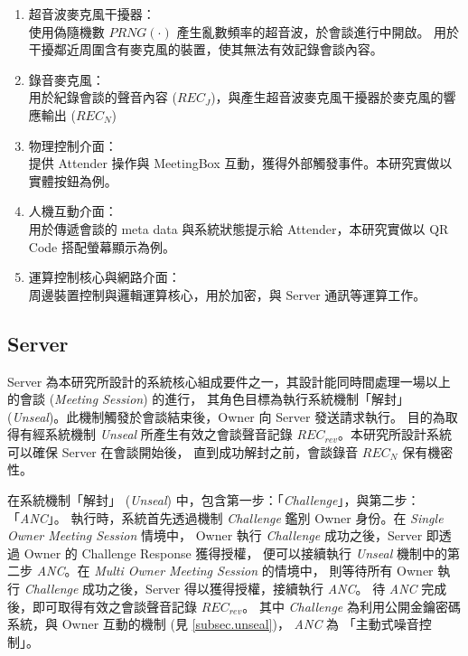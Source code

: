     \begin{enumerate}
        \item 超音波麥克風干擾器：\\
            使用偽隨機數 $PRNG(·)$ 產生亂數頻率的超音波，於會談進行中開啟。
            用於干擾鄰近周圍含有麥克風的裝置，使其無法有效記錄會談內容。

        \item 錄音麥克風：\\
            用於紀錄會談的聲音內容 ($REC_{J}$)，與產生超音波麥克風干擾器於麥克風的響應輸出 ($REC_{N}$)

        \item 物理控制介面：\\
            提供 Attender 操作與 MeetingBox 互動，獲得外部觸發事件。本研究實做以實體按鈕為例。

        \item 人機互動介面：\\
            用於傳遞會談的 meta data 與系統狀態提示給 Attender，本研究實做以 QR Code 搭配螢幕顯示為例。

        \item 運算控制核心與網路介面：\\
            周邊裝置控制與邏輯運算核心，用於加密，與 Server 通訊等運算工作。
    \end{enumerate}


\subsection{Server}

    Server 為本研究所設計的系統核心組成要件之一，其設計能同時間處理一場以上的會談 ({\it Meeting Session}) 的進行，
其角色目標為執行系統機制「解封」 ({\it Unseal})。此機制觸發於會談結束後，Owner 向 Server 發送請求執行。
目的為取得有經系統機制 {\it Unseal} 所產生有效之會談聲音記錄 $REC_{rev}$。本研究所設計系統可以確保 Server 在會談開始後，
直到成功解封之前，會談錄音 $REC_{N}$ 保有機密性。

    在系統機制「解封」 ({\it Unseal}) 中，包含第一步：「{\it Challenge}」，與第二步：「{\it ANC}」。
執行時，系統首先透過機制 {\it Challenge} 鑑別 Owner 身份。在 {\it Single Owner Meeting Session} 情境中，
Owner 執行 {\it Challenge} 成功之後，Server 即透過 Owner 的 Challenge Response 獲得授權，
便可以接續執行 {\it Unseal} 機制中的第二步 {\it ANC}。在 {\it Multi Owner Meeting Session} 的情境中，
則等待所有 Owner 執行 {\it Challenge} 成功之後，Server 得以獲得授權，接續執行 {\it ANC}。
待 {\it ANC} 完成後，即可取得有效之會談聲音記錄 $REC_{rev}$。
其中 {\it Challenge} 為利用公開金鑰密碼系統，與 Owner 互動的機制 (見 \ref{subsec.unseal})，
{\it ANC} 為 「主動式噪音控制」。


